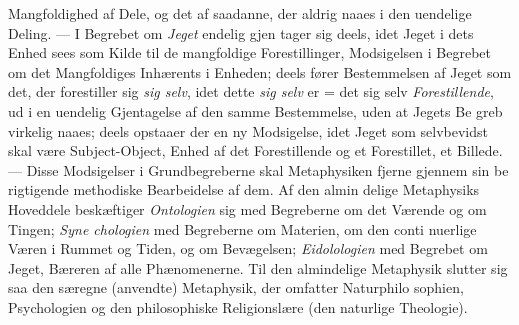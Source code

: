 \documentclass[12pt,a4paper]{book}
\begin{document}
Mangfoldighed af Dele, og det af saadanne, der aldrig naaes i
den uendelige Deling. --- I Begrebet om \emph{Jeget} endelig gjen\-%
tager sig deels, idet Jeget i dets Enhed sees som Kilde til de
mangfoldige Forestillinger, Modsigelsen i Begrebet om det
Mangfoldiges Inhærents i Enheden; deels fører Bestemmelsen
af Jeget som det, der forestiller sig \emph{sig selv}, idet dette \emph{sig
selv} er = det sig selv \emph{Forestillende}, ud i en uendelig
Gjentagelse af den samme Bestemmelse, uden at Jegets Be\-%
greb virkelig naaes; deels opstaaer der en ny Modsigelse, idet
Jeget som selvbevidst skal være Subject-Object, Enhed af det
Forestillende og et Forestillet, et Billede. --- Disse Modsigelser
i Grundbegreberne skal Metaphysiken fjerne gjennem sin be\-%
rigtigende methodiske Bearbeidelse af dem. Af den almin\-%
delige Metaphysiks Hoveddele beskæftiger \emph{Ontologien} sig
med Begreberne om det Værende og om Tingen; \emph{Syne\-%
chologien} med Begreberne om Materien, om den conti\-%
nuerlige Væren i Rummet og Tiden, og om Bevægelsen;
\emph{Eidolologien} med Begrebet om Jeget, Bæreren af alle
Phænomenerne. Til den almindelige Metaphysik slutter sig saa
den særegne (anvendte) Metaphysik, der omfatter Naturphilo\-%
sophien, Psychologien og den philosophiske Religionslære (den
naturlige Theologie).
\end{document}
